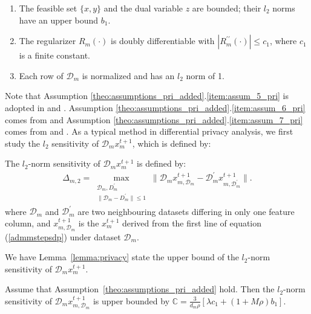 \begin{assume}\label{theo:assumptions_pri_added}
  \begin{enumerate}
    \item The feasible set $\{x,y\}$ and the dual variable $z$ are bounded; their $l_2$ norms have an upper bound $b_1$.\label{item:assum_5_pri}
    \item The regularizer $R_m(\cdot)$ is doubly differentiable
    with $|R_m^{\prime\prime}(\cdot)|\leq c_1$, where $c_1$ is a finite constant.\label{item:assum_6_pri}
    \item Each row of $\mathcal{D}_m$ is normalized and has an $l_2$ norm of 1.\label{item:assum_7_pri}
  \end{enumerate}
\end{assume}
Note that Assumption \ref{theo:assumptions_pri_added}.\ref{item:assum_5_pri} is adopted in \cite{sarwate2013signal} and \cite{wang2019global}. Assumption \ref{theo:assumptions_pri_added}.\ref{item:assum_6_pri} comes from \cite{zhang2017dynamic} and Assumption \ref{theo:assumptions_pri_added}.\ref{item:assum_7_pri} comes from \cite{zhang2017dynamic}
and \cite{sarwate2013signal}. As a typical method in differential privacy analysis, we first study the $l_2$ sensitivity of
$\mathcal{D}_mx_m^{t+1}$, which is defined by:
\begin{defi}
The $l_2$-norm sensitivity of $\mathcal{D}_mx_m^{t+1}$ is defined by:
  \begin{eqnarray*}
\Delta_{m,2}=\max_{\substack{\mathcal{D}_m,D_m^{\prime}\\
\|\mathcal{D}_m-D_m^{\prime}\|\leq1
}}\|\mathcal{D}_mx_{m,\mathcal{D}_m}^{t+1}
-\mathcal{D}_m^{\prime}x_{m,\mathcal{D}_m^{\prime}}^{t+1}\|.
  \end{eqnarray*}
  where $\mathcal{D}_m$ and $\mathcal{D}_m^{\prime}$ are two neighbouring datasets differing in 
  only one feature column, and 
  $x_{m,\mathcal{D}_m}^{t+1}$ is the $x_m^{t+1}$ derived from the first line of equation 
  (\ref{admmstepsdp}) under dataset $\mathcal{D}_m$.
\end{defi}
We have Lemma~\ref{lemma:privacy} state the upper bound of the $l_2$-norm sensitivity of $\mathcal{D}_mx_m^{t+1}$.
\begin{lemma}
\label{lemma:privacy}
  Assume that Assumption~\ref{theo:assumptions_pri_added} hold.
Then the $l_2$-norm sensitivity of $\mathcal{D}_mx_{m,\mathcal{D}_m}^{t+1}$ is upper bounded by $\mathbb{C}=\frac{3}{d_m\rho}\left[\lambda c_1+(1+M\rho)b_1\right]$.
\end{lemma}

